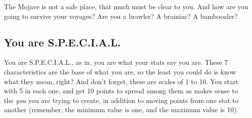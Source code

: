 \documentclass[11pt]{article} %
\begin{document}
The Mojave is not a safe place, that much must be clear to you. And how are you going to survive your voyages? Are you a brawler? A brainiac? A bamboozler? 

\subsection{You are S.P.E.C.I.A.L.}

You are S.P.E.C.I.A.L., as in, you are what your stats say you are. These 7 characteristics are the base of what you are, so the least you could do is know what they mean, right? And don't forget, these are scales of 1 to 10. You start with 5 in each one, and get 10 points to spread among them as makes sense to the \textit{you} you are trying to create, in addition to moving points from one stat to another (remember, the minimum value is one, and the maximum value is 10). 
\end{document}
